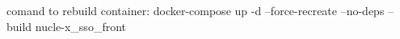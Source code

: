 comand to rebuild container:
    docker-compose up -d --force-recreate --no-deps --build nucle-x_sso_front
